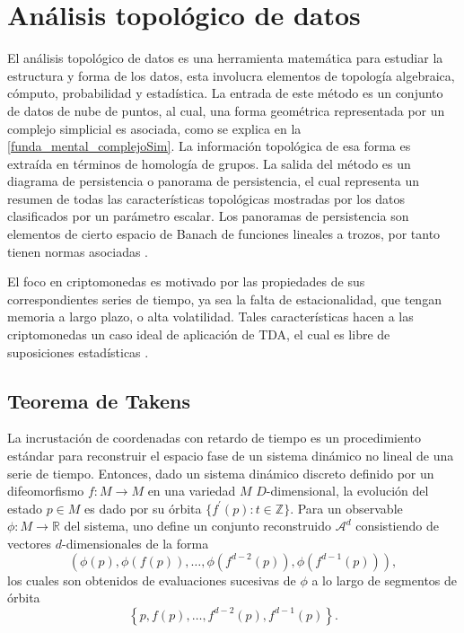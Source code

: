 \section{Análisis topológico de datos}

El análisis topológico de datos es una herramienta matemática para estudiar la estructura y forma de los datos, esta involucra elementos de topología algebraica, cómputo, probabilidad y estadística. 
La entrada de este método es un conjunto de datos de nube de puntos, al cual, una forma geométrica representada por un complejo simplicial es asociada, como se explica en la  \cref{funda_mental_complejoSim}. La información topológica de esa forma es extraída en términos de homología de grupos. La salida del método es un diagrama de persistencia o panorama de persistencia, el cual representa un resumen de todas las características topológicas mostradas por los datos clasificados por un parámetro escalar. Los panoramas de persistencia son elementos de cierto espacio de Banach de funciones lineales a trozos, por tanto tienen normas asociadas \parencite{gideaTopologicalRecognitionCritical2020}.

El foco en criptomonedas es motivado por las propiedades de sus correspondientes series de tiempo, ya sea la falta de estacionalidad, que tengan memoria a largo plazo, o alta volatilidad. Tales características hacen a las criptomonedas un caso ideal de aplicación de TDA, el cual es libre de suposiciones estadísticas \parencite{gideaTopologicalRecognitionCritical2020}.

\subsection{Teorema de Takens}

La incrustación de coordenadas con retardo de tiempo es un procedimiento estándar para reconstruir el espacio fase de un sistema dinámico no lineal de una serie de tiempo. Entonces, dado un sistema dinámico discreto definido por un difeomorfismo $f:M \to M$ en una variedad $M$ $D$-dimensional, la evolución del estado $p\in M$ es dado por su órbita $\mbox{\{$f^{\prime}(p):t\in \mathbb{Z}\}$}$. Para un observable $\phi:M \to \mathbb{R}$ del sistema, uno define un conjunto reconstruido $\mathcal{A}^d$ consistiendo de vectores $d$-dimensionales de la forma  
\[
\left(\phi(p), \phi(f(p)), \ldots, \phi\left(f^{d-2}(p)\right), \phi\left(f^{d-1}(p)\right)\right),
\]
los cuales son obtenidos de evaluaciones sucesivas de $\phi$ a lo largo de segmentos de órbita
\[
\left\{p, f(p), \ldots, f^{d-2}(p), f^{d-1}(p)\right\}.
\]

